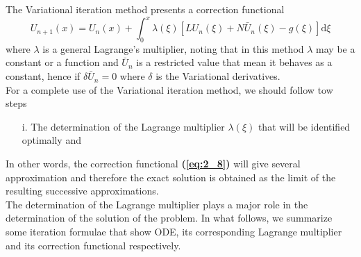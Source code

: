 \documentclass[12pt]{report}
\newcommand{\refn}[1]{\textbf{(\ref{#1})}}
\newcommand{\NI}{\noindent}
\begin{document}
	\NI The Variational iteration method presents a correction functional
	\begin{equation}
		U_{n+1}(x) = U_n(x) + \int_{0}^{x} \lambda(\xi)\left[LU_n(\xi) + N\bar{U}_n (\xi) - g(\xi)\right]\text{d}\xi \label{eq:2_8}
	\end{equation}
	where $\lambda$ is a general Lagrange's multiplier, noting that in this method $\lambda$ may be a constant or a function and $\bar{U}_n$ is a restricted value that mean it behaves as a constant, hence if $\delta\bar{U}_n=0$ where $\delta$ is the Variational derivatives.\\
	
	\NI For a complete use of the Variational iteration method, we should follow tow steps
	\begin{enumerate}
		\item[i.] The determination of the Lagrange multiplier $\lambda(\xi)$ that will be identified optimally and 
	\end{enumerate}
	In other words, the correction functional \refn{eq:2_8} will give several approximation and therefore the exact solution is obtained as the limit of the resulting successive approximations.\\
	
	\NI The determination of the Lagrange multiplier plays a major role in the determination of the solution of the problem. In what follows, we summarize some iteration formulae that show ODE, its corresponding Lagrange multiplier and its correction functional respectively.\\
	
\end{document}
